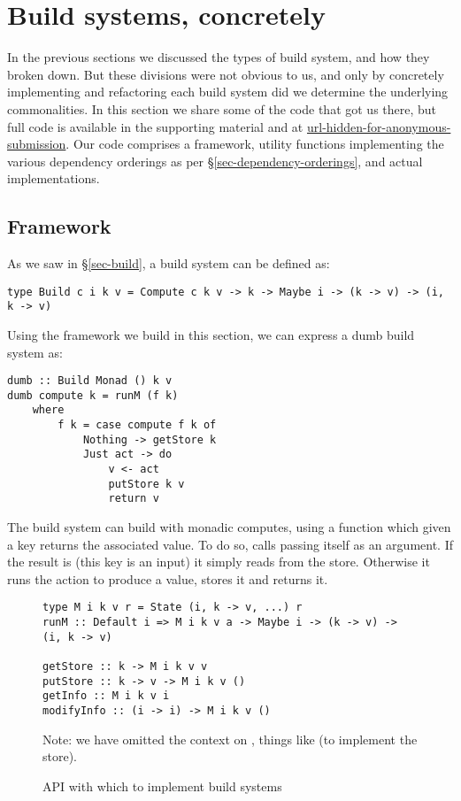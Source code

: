 \clearpage
\section{Build systems, concretely}\label{sec-implementations}

In the previous sections we discussed the types of build system, and how they broken down. But these divisions were not obvious to us, and only by concretely implementing and refactoring each build system did we determine the underlying commonalities. In this section we share some of the code that got us there, but full code is available in the supporting material and at \url{url-hidden-for-anonymous-submission}. Our code comprises a framework, utility functions implementing the various dependency orderings as per \S\ref{sec-dependency-orderings}, and actual implementations.

\subsection{Framework}

As we saw in \S\ref{sec-build}, a build system can be defined as:

\begin{verbatim}
type Build c i k v = Compute c k v -> k -> Maybe i -> (k -> v) -> (i, k -> v)
\end{verbatim}

Using the framework we build in this section, we can express a dumb build system as:

\begin{verbatim}
dumb :: Build Monad () k v
dumb compute k = runM (f k)
    where
        f k = case compute f k of
            Nothing -> getStore k
            Just act -> do
                v <- act
                putStore k v
                return v
\end{verbatim}

The  build system can build with monadic computes, using a function  which given a key returns the associated value. To do so,  calls  passing  itself as an argument. If the result is  (this key is an input) it simply reads from the store. Otherwise it runs the action to produce a value, stores it and returns it.

\begin{figure}
\begin{verbatim}
type M i k v r = State (i, k -> v, ...) r
runM :: Default i => M i k v a -> Maybe i -> (k -> v) -> (i, k -> v)

getStore :: k -> M i k v v
putStore :: k -> v -> M i k v ()
getInfo :: M i k v i
modifyInfo :: (i -> i) -> M i k v ()
\end{verbatim}
Note: we have omitted the context on , things like  (to implement the store).
\caption{API with which to implement build systems}
\label{fig-M-api}
\end{figure}

